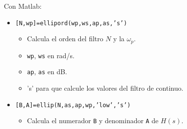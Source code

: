 \begin{frame}
\begin{itemize}
{{  \vspace{0.1cm}
  
  \footnotesize
  \item Con Matlab:
  
  \vspace{-0.1cm}
  
  \begin{itemize}
  \item \alert{\texttt{[N,wp]=ellipord(wp,ws,ap,as,'s')}}
  \begin{itemize}
  \color{gray}
  \item Calcula el orden del filtro $N$ y la $\omega_p$.
  \item \texttt{wp}, \texttt{ws} en rad/s.
  \item \texttt{ap}, \texttt{as} en dB.
  \item 's' para que calcule los valores del filtro de continuo.
  \end{itemize}
  \item \alert{\texttt{[B,A]=ellip(N,as,ap,wp,'low','s')}}
  \begin{itemize}
  \color{gray}
  \item Calcula el numerador \texttt{B} y denominador \texttt{A} de $H(s)$.
  \end{itemize}
  \end{itemize}
  }
  }
  \end{itemize}
  
\end{frame}

